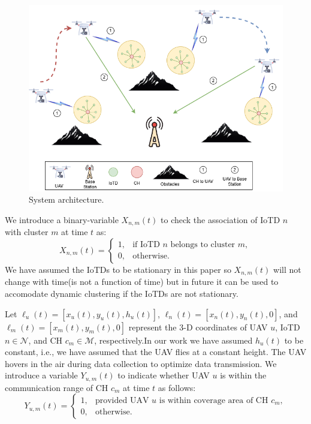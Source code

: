 \documentclass[conference]{IEEEtran}
\begin{document}

\begin{figure}[tbh!]
\centerline{\includegraphics[width=\columnwidth]{SystemModel.png}}
\caption{System architecture.}
\label{fig}
\end{figure}
We introduce a binary-variable $X_{n,m}(t)$ to check the association of IoTD $n$ with cluster $m$ at time $t$ as:
\begin{equation}\label{binary-v} 
    X_{n,m}(t) = 
    \begin{cases}
        1, & \mbox{if IoTD } n \mbox{ belongs to cluster } m,\\ 
        0, & \mbox{otherwise}.
    \end{cases}
\end{equation}
We have assumed the IoTDs to be stationary in this paper so $X_{n,m}(t)$ will not change with time(is not a function of time) but in future it can be used to accomodate dynamic clustering if the IoTDs are not stationary.

Let $\ell_u(t) = [x_u(t),y_u(t),h_u(t)]$, $\ell_n(t)=[x_n(t),y_n(t),0]$, and $\ell_m(t)=[x_m(t),y_m(t),0]$ represent the 3-D coordinates of UAV $u$, IoTD $n \in \mathcal{N}$, and CH $c_m \in \mathcal{M}$, respectively.In our work we have assumed $h_u(t)$ to be constant, i.e., we have assumed that the UAV flies at a constant height. The UAV hovers in the air during data collection to optimize data transmission. We introduce a variable $Y_{u,m}(t)$ to indicate whether UAV $u$ is within the communication range of CH $c_m$ at time $t$ as follows:
\begin{equation}\label{u-range}
    Y_{u,m}(t) = 
    \begin{cases}
        1, & \mbox{provided UAV } u \mbox{ is within coverage area of CH } c_m,\\ 
        0, & \mbox{otherwise}.
    \end{cases}
\end{equation}
\end{document}

